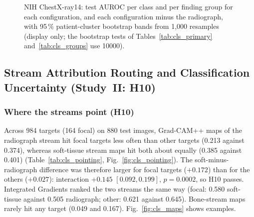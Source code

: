 \begin{table}[!t]
\centering
\caption{H8 per class: test AUROC of the radiograph and hybrid seed ensembles and the paired DeLong contrasts of the hybrid against the
radiograph and against channel stacking; Holm within dataset over classes and both contrasts.}
\label{tab:cls_per_class}
\end{table}

\begin{figure}[!t]
\centering
{}
\caption{NIH ChestX-ray14: test AUROC per class and per finding group for each configuration, and each configuration minus the
radiograph, with 95\,\% patient-cluster bootstrap bands from 1,000 resamples (display only; the bootstrap tests of
Tables~\ref{tab:cls_primary} and~\ref{tab:cls_groups} use \num{10000}).}
\label{fig:cls_per_class}
\end{figure}

\subsection{Stream Attribution Routing and Classification Uncertainty (Study~II: H10)}
\label{sec:res-attr}

\subsubsection{Where the streams point (H10)}
Across 984 targets (164 focal) on 880 test images, Grad-CAM++ maps of the radiograph stream hit focal targets less often than other targets
(0.213 against 0.374), whereas soft-tissue stream maps hit both about equally (0.385 against 0.401) (Table~\ref{tab:cls_pointing},
Fig.~\ref{fig:cls_pointing}). The soft-minus-radiograph difference was therefore larger for focal targets ($+0.172$) than for the others
($+0.027$): interaction $+0.145$ $[0.092,0.199]$, $p=0.0002$, so H10 passes. Integrated Gradients ranked the two streams the same way
(focal: 0.580 soft-tissue against 0.505 radiograph; other: 0.621 against 0.645). Bone-stream maps rarely hit any target (0.049 and 0.167).
Fig.~\ref{fig:cls_maps} shows examples.

\begin{table}[!t]
\centering
\caption{H10: pointing-game hit rates on the NIH expert boxes, means over targets of the per-target means over the five hybrid models;
tolerance 15\,px at 256\,px. Last row: soft-tissue minus radiograph stream (Grad-CAM++) and the interaction with its 95\,\%
image-cluster bootstrap interval.}
\label{tab:cls_pointing}
\end{table}


